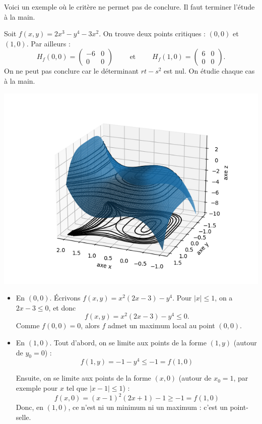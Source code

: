 Voici un exemple où le critère ne permet pas de conclure. Il faut terminer l'étude à la main.
\begin{exemple}{}{}
Soit $f(x,y)=2x^3-y^4-3x^2$. On trouve deux points critiques : $(0,0)$ et $(1,0)$. Par ailleurs :
$$H_f(0,0)=\begin{pmatrix}-6&0\\ 0&0\end{pmatrix}\qquad \text{ et } \qquad H_f(1,0)=\begin{pmatrix}6&0\\ 0&0\end{pmatrix}.$$
On ne peut pas conclure car le déterminant $rt-s^2$ est nul. On étudie chaque cas à la main.


\begin{center}
\includegraphics[scale=\myscale,scale=0.8]{figures/fonctions-extrem-5}
\end{center}


\begin{itemize}
	\item En $(0,0)$. 
	Écrivons $f(x,y)=x^2(2x-3)-y^4$.
	Pour $|x|\le 1$, on a $2x-3 \le0$, et donc 
	$$f(x,y)=x^2(2x-3)-y^4 \le 0.$$
	Comme $f(0,0)=0$, alors $f$ admet un maximum local au point $(0,0)$.
	
	\item  En $(1,0)$. 
	Tout d'abord, on se limite aux points de la forme $(1,y)$ (autour de $y_0=0$) :
		$$f(1,y)=-1-y^4\le -1 = f(1,0)$$
		
	Ensuite, on se limite aux points de la forme $(x,0)$ (autour de $x_0=1$, par exemple pour $x$ tel que  $|x-1|\leq 1$) : 
	$$ f(x,0)=(x-1)^2(2x+1)-1 \ge -1 = f(1,0)$$
	Donc, en $(1,0)$, ce n'est ni un minimum ni un maximum : c'est un point-selle.
	
\end{itemize}

\end{exemple}




